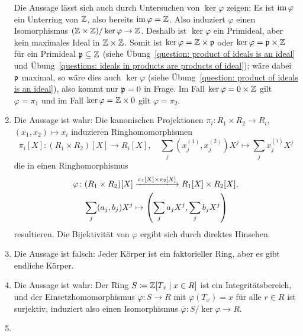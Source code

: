\begin{solution}
\begin{enumerate}
      Die Aussage lässt sich auch durch Untersuchen von $\ker \varphi$ zeigen:
      Es ist $\operatorname{im} \varphi$ ein Unterring von $\mathbb{Z}$, also bereits $\operatorname{im} \varphi = \mathbb{Z}$.
      Also induziert $\varphi$ einen Isomorphismus $(\mathbb{Z} \times \mathbb{Z})/\ker \varphi \to \mathbb{Z}$.
      Deshalb ist $\ker \varphi$ ein Primideal, aber kein maximales Ideal in $\mathbb{Z} \times \mathbb{Z}$.
      Somit ist $\ker \varphi = \mathbb{Z} \times \mathfrak{p}$ oder $\ker \varphi = \mathfrak{p} \times \mathbb{Z}$ für ein Primideal $\mathfrak{p} \subseteq \mathbb{Z}$ (siehe Übung~\ref{question: product of ideals is an ideal} und Übung~\ref{questions: ideals in products are products of ideal}); wäre dabei $\mathfrak{p}$ maximal, so wäre dies auch $\ker \varphi$ (siehe Übung~\ref{question: product of ideals is an ideal}), also kommt nur $\mathfrak{p} = 0$ in Frage.
      Im Fall $\ker \varphi = 0 \times \mathbb{Z}$ gilt $\varphi = \pi_1$ und im Fall $\ker \varphi = \mathbb{Z} \times 0$ gilt $\varphi = \pi_2$.
    \item
      Die Aussage ist wahr:
      Die kanonischen Projektionen $\pi_i \colon R_1 \times R_2 \to R_i$, $(x_1, x_2) \mapsto x_i$ induzieren Ringhomomorphismen
      \[
                \pi_i[X]
        \colon  (R_1 \times R_2)[X] \to R_i[X],
        \quad
                \sum_j \left( x^{(1)}_j, x^{(2)}_j \right) X^j
        \mapsto \sum_j x^{(i)}_j X^j
      \]
      die in einen Ringhomorphismus
      \begin{align*}
                                                    \varphi
         \colon                                     (R_1 \times R_2)[X]
        &\xlongrightarrow{\pi_1[X] \times \pi_2[X]} R_1[X] \times R_2[X],
        \\
                                                    \sum_j (a_j, b_j) X^j
        &\mapsto                                    \left( \sum_j a_j X^j, \sum_j b_j X^j \right)
      \end{align*}
      resultieren.
      Die Bijektivität von $\varphi$ ergibt sich durch direktes Hinsehen.
    \item
      Die Aussage ist falsch:
      Jeder Körper ist ein faktorieller Ring, aber es gibt endliche Körper.
    \item
      Die Aussage ist wahr:
      Der Ring $S \coloneqq \mathbb{Z}[T_x \mid x \in R]$ ist ein Integritätsbereich, und der Einsetzhomomorphismus $\varphi \colon S \to R$ mit $\varphi(T_x) = x$ für alle $r \in R$ ist surjektiv, induziert also einen Isomorphismus $\overline{\varphi} \colon S / \ker \varphi \to R$.
    \item

\end{enumerate}
\end{solution}
